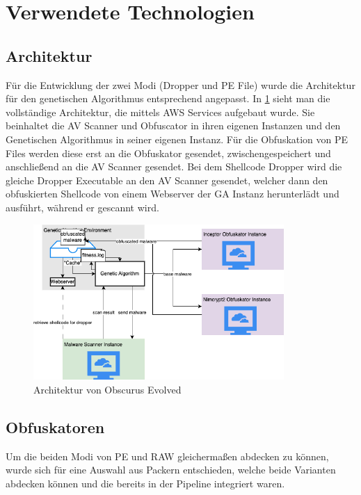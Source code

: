 \section{Verwendete Technologien}
\label{Sec:Technologie}
\subsection{Architektur}
Für die Entwicklung der zwei Modi (Dropper und PE File) wurde die Architektur für den genetischen Algorithmus entsprechend angepasst. In \ref{fig:architecture} sieht man die vollständige Architektur, die mittels AWS Services aufgebaut wurde. Sie beinhaltet die AV Scanner und Obfuscator in ihren eigenen Instanzen und den Genetischen Algorithmus in seiner eigenen Instanz. Für die Obfuskation von PE Files werden diese erst an die Obfuskator gesendet, zwischengespeichert und anschließend an die AV Scanner gesendet. Bei dem Shellcode Dropper wird die gleiche Dropper Executable an den AV Scanner gesendet, welcher dann den obfuskierten Shellcode von einem Webserver der GA Instanz herunterlädt und ausführt, während er gescannt wird.
\begin{figure}[h]
    \centering
    \includegraphics[width=0.85\textwidth]{gfx/Abbildungen/Architektur.drawio.png}
    \caption{Architektur von Obscurus Evolved}
    \label{fig:architecture}
\end{figure}

\subsection{Obfuskatoren}
Um die beiden Modi von PE und RAW gleichermaßen abdecken zu können, wurde sich für eine Auswahl aus Packern entschieden, welche beide Varianten abdecken können und die bereits in der Pipeline integriert waren.

